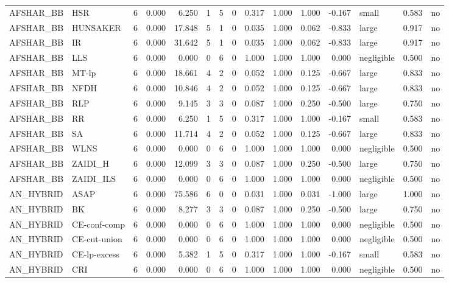 \begin{table}[htbp]
\begin{tabular}{llrrrrrrrrrrlrr}
AFSHAR\_BB & HSR & 6 & 0.000 & 6.250 & 1 & 5 & 0 & 0.317 & 1.000 & 1.000 & -0.167 & small & 0.583 & no \\
AFSHAR\_BB & HUNSAKER & 6 & 0.000 & 17.848 & 5 & 1 & 0 & 0.035 & 1.000 & 0.062 & -0.833 & large & 0.917 & no \\
AFSHAR\_BB & IR & 6 & 0.000 & 31.642 & 5 & 1 & 0 & 0.035 & 1.000 & 0.062 & -0.833 & large & 0.917 & no \\
AFSHAR\_BB & LLS & 6 & 0.000 & 0.000 & 0 & 6 & 0 & 1.000 & 1.000 & 1.000 & 0.000 & negligible & 0.500 & no \\
AFSHAR\_BB & MT-lp & 6 & 0.000 & 18.661 & 4 & 2 & 0 & 0.052 & 1.000 & 0.125 & -0.667 & large & 0.833 & no \\
AFSHAR\_BB & NFDH & 6 & 0.000 & 10.846 & 4 & 2 & 0 & 0.052 & 1.000 & 0.125 & -0.667 & large & 0.833 & no \\
AFSHAR\_BB & RLP & 6 & 0.000 & 9.145 & 3 & 3 & 0 & 0.087 & 1.000 & 0.250 & -0.500 & large & 0.750 & no \\
AFSHAR\_BB & RR & 6 & 0.000 & 6.250 & 1 & 5 & 0 & 0.317 & 1.000 & 1.000 & -0.167 & small & 0.583 & no \\
AFSHAR\_BB & SA & 6 & 0.000 & 11.714 & 4 & 2 & 0 & 0.052 & 1.000 & 0.125 & -0.667 & large & 0.833 & no \\
AFSHAR\_BB & WLNS & 6 & 0.000 & 0.000 & 0 & 6 & 0 & 1.000 & 1.000 & 1.000 & 0.000 & negligible & 0.500 & no \\
AFSHAR\_BB & ZAIDI\_H & 6 & 0.000 & 12.099 & 3 & 3 & 0 & 0.087 & 1.000 & 0.250 & -0.500 & large & 0.750 & no \\
AFSHAR\_BB & ZAIDI\_ILS & 6 & 0.000 & 0.000 & 0 & 6 & 0 & 1.000 & 1.000 & 1.000 & 0.000 & negligible & 0.500 & no \\
AN\_HYBRID & ASAP & 6 & 0.000 & 75.586 & 6 & 0 & 0 & 0.031 & 1.000 & 0.031 & -1.000 & large & 1.000 & no \\
AN\_HYBRID & BK & 6 & 0.000 & 8.277 & 3 & 3 & 0 & 0.087 & 1.000 & 0.250 & -0.500 & large & 0.750 & no \\
AN\_HYBRID & CE-conf-comp & 6 & 0.000 & 0.000 & 0 & 6 & 0 & 1.000 & 1.000 & 1.000 & 0.000 & negligible & 0.500 & no \\
AN\_HYBRID & CE-cut-union & 6 & 0.000 & 0.000 & 0 & 6 & 0 & 1.000 & 1.000 & 1.000 & 0.000 & negligible & 0.500 & no \\
AN\_HYBRID & CE-lp-excess & 6 & 0.000 & 5.382 & 1 & 5 & 0 & 0.317 & 1.000 & 1.000 & -0.167 & small & 0.583 & no \\
AN\_HYBRID & CRI & 6 & 0.000 & 0.000 & 0 & 6 & 0 & 1.000 & 1.000 & 1.000 & 0.000 & negligible & 0.500 & no \\

\end{tabular}
\end{table}
